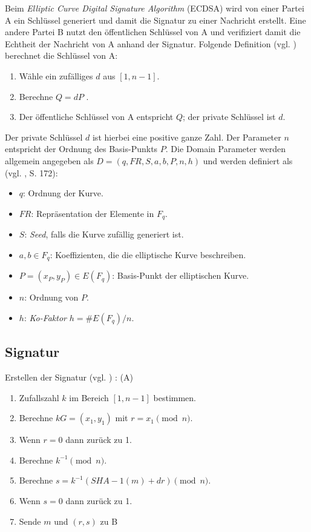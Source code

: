 Beim \textit{Elliptic Curve Digital Signature Algorithm} (ECDSA) wird von einer Partei A ein Schlüssel generiert und damit die Signatur zu einer Nachricht erstellt. Eine andere Partei B nutzt den öffentlichen Schlüssel von A und verifiziert damit die Echtheit der Nachricht von A anhand der Signatur. Folgende Definition (vgl. \cite{hwimp}) berechnet die Schlüssel von A: \\

\begin{enumerate}
\item Wähle ein zufälliges $d$ aus $[1, n-1]$.
\item Berechne $Q = dP$ .
\item Der öffentliche Schlüssel von A entspricht $Q$; der private Schlüssel ist $d$. \\
\end{enumerate}

Der private Schlüssel $d$ ist hierbei eine positive ganze Zahl. Der Parameter $n$ entspricht der Ordnung des Basis-Punkts $P$. Die Domain Parameter werden allgemein angegeben als $D = (q,FR, S,a,b, P,n,h)$ und werden definiert als (vgl. \cite{guide}, S. 172): \\

\begin{itemize}
\item $q$: Ordnung der Kurve.
\item $FR$: Repräsentation der Elemente in $F_q$.
\item $S$: \textit{Seed}, falls die Kurve zufällig generiert ist.
\item $a,b \in F_q$: Koeffizienten, die die elliptische Kurve beschreiben.
\item $P = (x_P,y_P) \in E(F_q)$: Basis-Punkt der elliptischen Kurve.
\item $n$: Ordnung von $P$.
\item $h$: \textit{Ko-Faktor} $h = \#E(F_q)/n$.
\end{itemize}

\subsection{Signatur}
Erstellen der Signatur (vgl. \cite{hwimp}) : (A)

\begin{enumerate}
\item Zufallszahl $k$ im Bereich $[1, n - 1]$ bestimmen.
\item Berechne $k G = (x_1, y_1)$ mit $r = x_1 \pmod{n} $.
\item Wenn $r = 0$ dann zurück zu 1.
\item Berechne $k^{-1} \pmod{n}$.
\item Berechne $s = k^{-1}(SHA-1(m) + dr)\pmod{n}$.
\item Wenn $s = 0$ dann zurück zu 1.
\item Sende $m$ und $(r, s)$ zu B
\end{enumerate}

